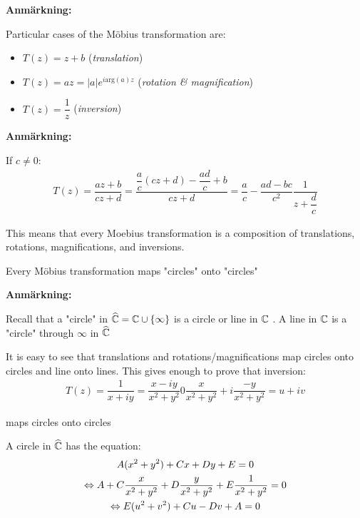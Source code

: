 \par\bigskip
\noindent\textbf{Anmärkning:}\par
\noindent Particular cases of the Möbius transformation are:\par
\begin{itemize}
  \item $T(z) = z+b$ (\textit{translation})
  \item $T(z) = az = \left|a\right|e^{i\text{arg}(a)z}$ (\textit{rotation \& magnification})
  \item $T(z) = \dfrac{1}{z}$ (\textit{inversion})
\end{itemize}
\par\bigskip
\noindent\textbf{Anmärkning:}\par
\noindent If $c\neq0$:
\begin{equation*}
  \begin{gathered}
    T(z) = \dfrac{az+b}{cz+d} = \dfrac{\dfrac{a}{c}(cz+d)-\dfrac{ad}{c}+b}{cz+d} = \dfrac{a}{c}-\dfrac{ad-bc}{c^2}\dfrac{1}{z+\dfrac{d}{c}}
  \end{gathered}
\end{equation*}\par
\noindent This means that every Moebius transformation is a composition of translations, rotations, magnifications, and inversions. 
\par\bigskip
\begin{theo}[]{}
  Every Möbius transformation maps "circles" onto "circles"
\end{theo}
\par\bigskip
\noindent\textbf{Anmärkning:}\par
\noindent Recall that a "circle" in $\widehat{\mathbb{C}} = \mathbb{C}\cup\left\{\infty\right\}$ is a circle or line in $\mathbb{C}$ . A line in $\mathbb{C}$ is a "circle" through $\infty$ in $\widehat{\mathbb{C}}$
\par\bigskip
\begin{prf}[]{}
  It is easy to see that translations and rotations/magnifications map circles onto circles and line onto lines. This gives enough to prove that inversion:
  \begin{equation*}
    \begin{gathered}
      T(z) = \dfrac{1}{x+iy} = \dfrac{x-iy}{x^2+y^2} 0 \dfrac{x}{x^2+y^2}+i\dfrac{-y}{x^2+y^2} = u+iv
    \end{gathered}
  \end{equation*}\par
  \noindent maps circles onto circles
  \par\bigskip
  A circle in $\widehat{\mathbb{C}}$ has the equation:
  \begin{equation*}
    \begin{gathered}
      A(x^2+y^2)+Cx+Dy+E = 0\\
      \Leftrightarrow A+C\dfrac{x}{x^2+y^2} + D\dfrac{y}{x^2+y^2}+E\dfrac{1}{x^2+y^2} = 0\\
      \Leftrightarrow E(u^2+v^2) +Cu-Dv+A = 0
    \end{gathered}
  \end{equation*}
\end{prf}
